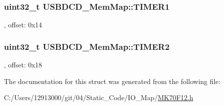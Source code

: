 \subsubsection[{T\+I\+M\+E\+R1}]{\setlength{\rightskip}{0pt plus 5cm}uint32\+\_\+t U\+S\+B\+D\+C\+D\+\_\+\+Mem\+Map\+::\+T\+I\+M\+E\+R1}\label{struct_u_s_b_d_c_d___mem_map_aa8bcdbeba3cbd7a27281d317ba5484e9}
, offset\+: 0x14 \hypertarget{struct_u_s_b_d_c_d___mem_map_abaa84a33ed5173cf08f87f3590a3f035}{}
\subsubsection[{T\+I\+M\+E\+R2}]{\setlength{\rightskip}{0pt plus 5cm}uint32\+\_\+t U\+S\+B\+D\+C\+D\+\_\+\+Mem\+Map\+::\+T\+I\+M\+E\+R2}\label{struct_u_s_b_d_c_d___mem_map_abaa84a33ed5173cf08f87f3590a3f035}
, offset\+: 0x18 

The documentation for this struct was generated from the following file\+:\begin{DoxyCompactItemize}
\item 
C\+:/\+Users/12913000/git/04/\+Static\+\_\+\+Code/\+I\+O\+\_\+\+Map/\hyperlink{_m_k70_f12_8h}{M\+K70\+F12.\+h}\end{DoxyCompactItemize}
